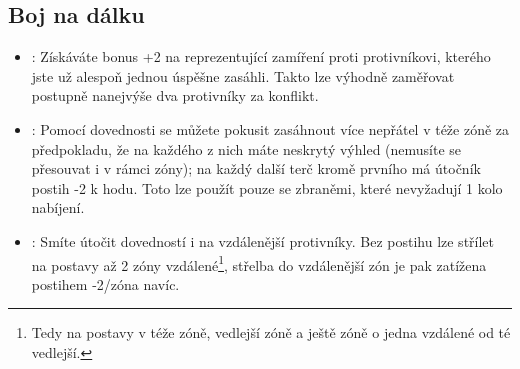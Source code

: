 \subsection{Boj na dálku}
\label{sec:trik-bnd}
\begin{itemize}
\item{}:
\label{sec:bnd-odstrelovac}
Získáváte bonus +2 na  reprezentující zamíření proti protivníkovi, kterého jste už alespoň jednou úspěšne zasáhli. Takto lze výhodně zaměřovat postupně nanejvýše dva protivníky za konflikt.

\item{}:
\label{sec:bnd-mnohonasobny}
Pomocí dovednosti  se můžete pokusit zasáhnout více nepřátel v téže zóně za předpokladu, že na každého z nich máte neskrytý výhled (nemusíte se přesouvat i v rámci zóny); na každý další terč kromě prvního má útočník postih -2 k hodu. Toto lze použít pouze se zbraněmi, které nevyžadují 1 kolo nabíjení.

\item {}:
\label{sec:bnd-odstrelovac}
Smíte útočit dovedností  i na vzdálenější protivníky. Bez postihu lze střílet na postavy až 2 zóny vzdálené\footnote{Tedy na postavy v téže zóně, vedlejší zóně a ještě zóně o jedna vzdálené od té vedlejší.}, střelba do vzdálenější zón je pak zatížena postihem -2/zóna navíc. 

\end{itemize}
  
